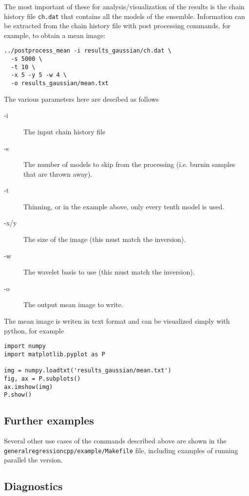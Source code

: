 \documentclass[a4paper,12pt]{article}
\begin{document}
The most important of these for analysis/visualization of the results is the chain
history file {\tt ch.dat} that contains all the models of the ensemble.
Information can be extracted from the chain history file with post processing
commands, for example, to obtain a mean image:

\begin{verbatim}
../postprocess_mean -i results_gaussian/ch.dat \
  -s 5000 \
  -t 10 \
  -x 5 -y 5 -w 4 \
  -o results_gaussian/mean.txt
\end{verbatim}

The various parameters here are descibed as follows

\begin{description}
\item[-i] The input chain history file
\item[-s] The number of models to skip from the processing (i.e. burnin samples that
  are thrown away).
\item[-t] Thinning, or in the example above, only every tenth model is used.
\item[-x/y] The size of the image (this must match the inversion).
\item[-w] The wavelet basis to use (this must match the inversion).
\item[-o] The output mean image to write.
\end{description}

The mean image is writen in text format and can be visualized simply
with python, for example

\begin{verbatim}
import numpy
import matplotlib.pyplot as P

img = numpy.loadtxt('results_gaussian/mean.txt')
fig, ax = P.subplots()
ax.imshow(img)
P.show()
\end{verbatim}

\subsection{Further examples}

Several other use cases of the commands described above are shown in the
{\tt generalregressioncpp/example/Makefile} file, including examples
of running parallel the version.
  
\subsection{Diagnostics}
\end{document}
